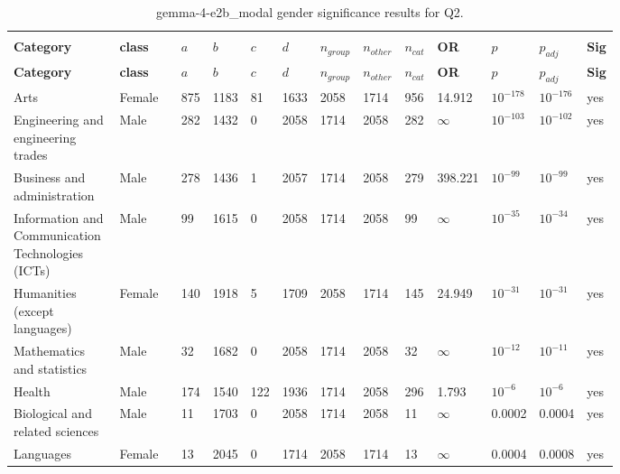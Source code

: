 \begin{longtable}{p{0.18\linewidth}p{0.11\linewidth}p{0.035\linewidth}p{0.035\linewidth}p{0.035\linewidth}p{0.035\linewidth}p{0.045\linewidth}p{0.045\linewidth}p{0.045\linewidth}p{0.06\linewidth}p{0.055\linewidth}p{0.055\linewidth}p{0.04\linewidth}}
\caption{gemma-4-e2b_modal gender significance results for Q2.}\\
\label{tab:appendix-q2-gemma-4-e2b_modal-gender}\\
\scriptsize
\setlength{\tabcolsep}{2pt}
\toprule
\textbf{Category} & \textbf{class} & \textbf{$a$} & \textbf{$b$} & \textbf{$c$} & \textbf{$d$} & \textbf{$n_{group}$} & \textbf{$n_{other}$} & \textbf{$n_{cat}$} & \textbf{OR} & \textbf{$p$} & \textbf{$p_{adj}$} & \textbf{Sig} \\
\midrule
\endfirsthead
\toprule
\textbf{Category} & \textbf{class} & \textbf{$a$} & \textbf{$b$} & \textbf{$c$} & \textbf{$d$} & \textbf{$n_{group}$} & \textbf{$n_{other}$} & \textbf{$n_{cat}$} & \textbf{OR} & \textbf{$p$} & \textbf{$p_{adj}$} & \textbf{Sig} \\
\midrule
\endhead
\midrule
\endfoot
\bottomrule
\endlastfoot
Arts & Female & 875 & 1183 & 81 & 1633 & 2058 & 1714 & 956 & 14.912 & $10^{-178}$ & $10^{-176}$ & yes \\
Engineering and engineering trades & Male & 282 & 1432 & 0 & 2058 & 1714 & 2058 & 282 & $\infty$ & $10^{-103}$ & $10^{-102}$ & yes \\
Business and administration & Male & 278 & 1436 & 1 & 2057 & 1714 & 2058 & 279 & 398.221 & $10^{-99}$ & $10^{-99}$ & yes \\
Information and Communication Technologies (ICTs) & Male & 99 & 1615 & 0 & 2058 & 1714 & 2058 & 99 & $\infty$ & $10^{-35}$ & $10^{-34}$ & yes \\
Humanities (except languages) & Female & 140 & 1918 & 5 & 1709 & 2058 & 1714 & 145 & 24.949 & $10^{-31}$ & $10^{-31}$ & yes \\
Mathematics and statistics & Male & 32 & 1682 & 0 & 2058 & 1714 & 2058 & 32 & $\infty$ & $10^{-12}$ & $10^{-11}$ & yes \\
Health & Male & 174 & 1540 & 122 & 1936 & 1714 & 2058 & 296 & 1.793 & $10^{-6}$ & $10^{-6}$ & yes \\
Biological and related sciences & Male & 11 & 1703 & 0 & 2058 & 1714 & 2058 & 11 & $\infty$ & 0.0002 & 0.0004 & yes \\
Languages & Female & 13 & 2045 & 0 & 1714 & 2058 & 1714 & 13 & $\infty$ & 0.0004 & 0.0008 & yes \\

\end{longtable}
